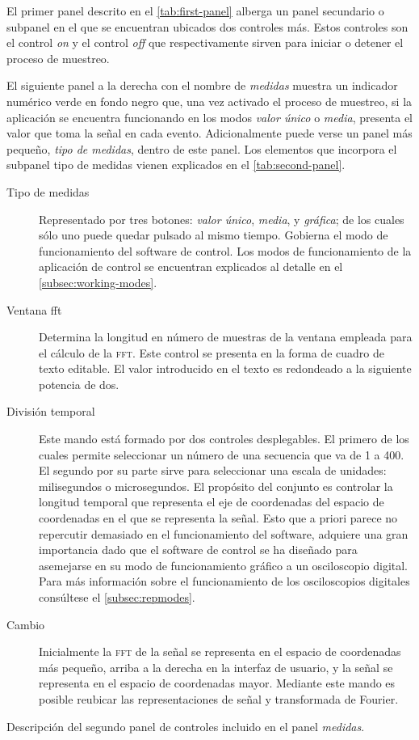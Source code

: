 El primer panel descrito en el \vref{tab:first-panel} alberga un panel secundario o subpanel en el que se encuentran ubicados dos controles más. Estos controles son el control \emph{on} y el control \emph{off} que respectivamente sirven para iniciar o detener el proceso de muestreo.\par
El siguiente panel a la derecha con el nombre de \emph{medidas} muestra un indicador numérico verde en fondo negro que, una vez activado el proceso de muestreo, si la aplicación se encuentra funcionando en los modos \emph{valor único} o \emph{media}, presenta el valor que toma la señal en cada evento. Adicionalmente puede verse un panel más pequeño, \emph{tipo de medidas}, dentro de este panel. Los elementos que incorpora el subpanel tipo de medidas vienen explicados en el \vref{tab:second-panel}.

\begin{table}
	\centering
	\begin{minipage}{.85\textwidth}
		\begin{description}
			\item[Tipo de medidas] Representado por tres botones: \emph{valor único}, \emph{media}, y \emph{gráfica}; de los cuales sólo uno puede quedar pulsado al mismo tiempo. Gobierna el modo de funcionamiento del software de control. Los modos de funcionamiento de la aplicación de control se encuentran explicados al detalle en el \vref{subsec:working-modes}.
			\item[Ventana fft] Determina la longitud en número de muestras de la ventana empleada para el cálculo de la \textsc{fft}. Este control se presenta en la forma de cuadro de texto editable. El valor introducido en el texto es redondeado a la siguiente potencia de dos.
			\item[División temporal] Este mando está formado por dos controles desplegables. El primero de los cuales permite seleccionar un número de una secuencia que va de 1 a 400. El segundo por su parte sirve para seleccionar una escala de unidades: milisegundos o microsegundos. El propósito del conjunto es controlar la longitud temporal que representa el eje de coordenadas del espacio de coordenadas en el que se representa la señal. Esto que a priori parece no repercutir demasiado en el funcionamiento del software, adquiere una gran importancia dado que el software de control se ha diseñado para asemejarse en su modo de funcionamiento gráfico a un osciloscopio digital. Para más información sobre el funcionamiento de los osciloscopios digitales consúltese el \vref{subsec:repmodes}.
			\item[Cambio] Inicialmente la \textsc{fft} de la señal se representa en el espacio de coordenadas más pequeño, arriba a la derecha en la interfaz de usuario, y la señal se representa en el espacio de coordenadas mayor. Mediante este mando es posible reubicar las representaciones de señal y transformada de Fourier.
		\end{description}
	\end{minipage}
	\caption[Descripción del segundo panel de controles]{Descripción del segundo panel de controles incluido en el panel \emph{medidas}.}
	\label{tab:second-panel}
\end{table}

